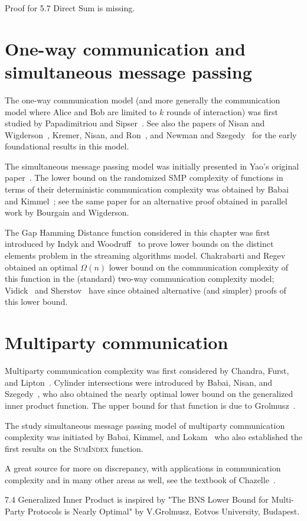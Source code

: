 Proof for 5.7 Direct Sum is missing.


\section{One-way communication and simultaneous message passing}

The one-way communication model (and more generally the communication model where Alice and Bob are limited to $k$ rounds of interaction) was first studied by Papadimitriou and Sipser~\cite{PapadimitriouS84}. See also the papers of Nisan and Wigderson~\cite{NisanW93}, Kremer, Nisan, and Ron~\cite{KremerNR99}, and Newman and Szegedy~\cite{NewmanS96} for the early foundational results in this model.

The simultaneous message passing model was initially presented in Yao's original paper~\cite{Yao79}. The lower bound on the randomized SMP complexity of functions in terms of their deterministic communication complexity was obtained by Babai and Kimmel~\cite{BabaiK97}; see the same paper for an alternative proof obtained in parallel work by Bourgain and Wigderson.

The Gap Hamming Distance function considered in this chapter was first introduced by Indyk and Woodruff~\cite{IndykW03} to prove lower bounds on the distinct elements problem in the streaming algorithms model. Chakrabarti and Regev~\cite{ChakrabartiR12} obtained an optimal $\Omega(n)$ lower bound on the communication complexity of this function in the (standard) two-way communication complexity model; Vidick~\cite{Vidick13} and Sherstov~\cite{Sherstov12ghd} have since obtained alternative (and simpler) proofs of this lower bound.

\section{Multiparty communication}

Multiparty communication complexity was first considered by Chandra, Furst, and Lipton~\cite{ChandraFL83b}. Cylinder intersections were introduced by Babai, Nisan, and Szegedy~\cite{BabaiNS92}, who also obtained the nearly optimal lower bound on the generalized inner product function. The upper bound for that function is due to Grolmusz~\cite{Grolmusz94}.

The study simultaneous message passing model of multiparty communication complexity was initiated by Babai, Kimmel, and Lokam~\cite{BabaiKL95} who also established the first results on the \textsc{SumIndex} function.

A great source for more on discrepancy, with applications in communication complexity and in many other areas as well, see the textbook of Chazelle~\cite{Chazelle01}.

7.4 Generalized Inner Product is inspired by "The BNS Lower Bound for Multi-Party Protocols is Nearly Optimal" by V.Grolmusz, Eotvos University, Budapest.

